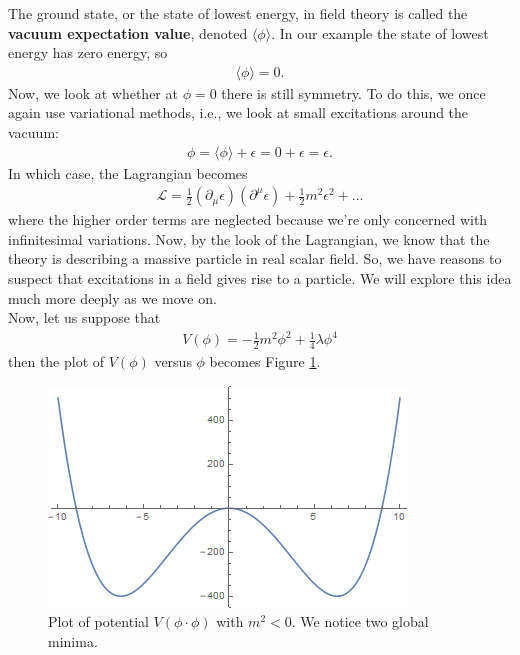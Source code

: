 \documentclass{book}
\numberwithin{equation}{section}
\theoremstyle{definition}
\newcommand{\p}{\partial}
\newcommand{\lag}{\mathcal{L}}
\begin{document}
The ground state, or the state of lowest energy, in field theory is called the \textbf{vacuum expectation value}, denoted $\langle \phi \rangle$. In our example the state of lowest energy has zero energy, so
\begin{align}
\langle \phi \rangle  = 0.
\end{align}
Now, we look at whether at $\phi = 0$ there is still symmetry. To do this, we once again use variational methods, i.e., we look at small excitations around the vacuum:
\begin{align}
\phi = \langle \phi \rangle + \epsilon = 0+\epsilon = \epsilon.
\end{align}
In which case, the Lagrangian becomes
\begin{align}
\lag = \frac{1}{2}(\p_\mu\epsilon)(\p^\mu\epsilon) + \frac{1}{2}m^2\epsilon^2+\dots
\end{align}
where the higher order terms are neglected because we're only concerned with infinitesimal variations. Now, by the look of the Lagrangian, we know that the theory is describing a massive particle in real scalar field. So, we have reasons to suspect that excitations in a field gives rise to a particle. We will explore this idea much more deeply as we move on.\\

Now, let us suppose that 
\begin{align}
V(\phi) = -\frac{1}{2}m^2\phi^2 + \frac{1}{4}\lambda \phi^4
\end{align}
then the plot of $V(\phi)$ versus $\phi$ becomes Figure \ref{curve}.\\
\begin{figure}[h!]
	\centering
	\includegraphics[scale=1]{curve.png}
	\caption{Plot of potential $V(\phi\cdot \phi)$ with $m^2 < 0$. We notice two global minima.}
	\label{curve}
\end{figure}
\end{document}
